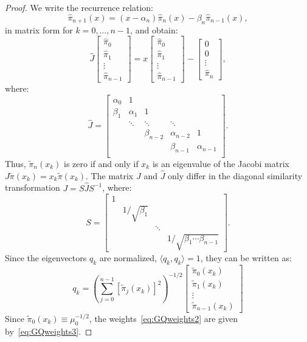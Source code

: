 \begin{proof}
We write the recurrence relation:
\[
\hat{\pi}_{n+1}(x) = (x-\alpha_n)\hat{\pi}_n(x) - \beta_n\hat{\pi}_{n-1}(x),
\]
in matrix form for $k=0,\ldots,n-1$, and obtain:
\[
\hat{J}\begin{bmatrix} \hat{\pi}_0\\\hat{\pi}_1\\\vdots\\\hat{\pi}_{n-1}\end{bmatrix}
=
x\begin{bmatrix} \hat{\pi}_0\\\hat{\pi}_1\\\vdots\\\hat{\pi}_{n-1}\end{bmatrix}
-
\begin{bmatrix} 0\\0\\\vdots\\\hat{\pi}_n\end{bmatrix},
\]
where:
\[
\hat{J} = \begin{bmatrix}
\alpha_0 & 1\\
\beta_1 & \alpha_1 & 1\\
& \ddots & \ddots & \ddots\\
& & \beta_{n-2} & \alpha_{n-2} & 1\\
& & & \beta_{n-1} & \alpha_{n-1}\\
\end{bmatrix}.
\]
Thus, $\tilde{\pi}_n(x_k)$ is zero if and only if $x_k$ is an eigenvalue of the Jacobi matrix $J\tilde{\pi}(x_k) = x_k\tilde{\pi}(x_k)$. The matrix $J$ and $\hat{J}$ only differ in the diagonal similarity transformation $J = S\hat{J}S^{-1}$, where:
\[
S = \begin{bmatrix}
1\\
& 1/\sqrt{\beta_1}\\
& & \ddots\\
& & & 1/\sqrt{\beta_1\cdots\beta_{n-1}}
\end{bmatrix}.
\]
Since the eigenvectors $q_k$ are normalized, $\langle q_k, q_k\rangle = 1$, they can be written as:
\[
q_k = \left(\sum_{j=0}^{n-1}[\tilde{\pi}_j(x_k)]^2\right)^{-1/2}\begin{bmatrix}\tilde{\pi}_0(x_k)\\\tilde{\pi}_1(x_k)\\\vdots\\\tilde{\pi}_{n-1}(x_k)\end{bmatrix}
\]
Since $\tilde{\pi}_0(x_k) \equiv \mu_0^{-1/2}$, the weights~\eqref{eq:GQweights2} are given by~\eqref{eq:GQweights3}.
\end{proof}

